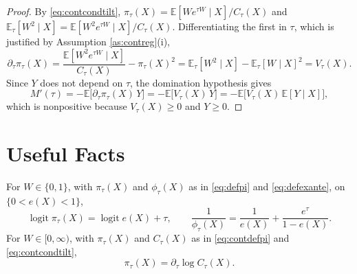 \documentclass[11pt]{article}
\theoremstyle{definition}
\theoremstyle{plain}
\newcommand{\E}{\mathbb{E}}
\newcommand{\1}{\mathbf{1}}
\begin{document}
\begin{proof}
By \eqref{eq:contcondtilt}, $\pi_\tau(X)=\E[We^{\tau W}\mid X]/C_\tau(X)$ and $\E_\tau[W^2\mid X]=\E[W^2e^{\tau W}\mid X]/C_\tau(X)$.  Differentiating the first in $\tau$, which is justified by Assumption \ref{as:contreg}(i),
\[
\partial_\tau\pi_\tau(X)
=\frac{\E[W^2e^{\tau W}\mid X]}{C_\tau(X)}-\pi_\tau(X)^2
=\E_\tau[W^2\mid X]-\E_\tau[W\mid X]^2
=V_\tau(X).
\]
Since $Y$ does not depend on $\tau$, the domination hypothesis gives
\[
M'(\tau)=-\E\bigl[\partial_\tau\pi_\tau(X)\,Y\bigr]=-\E\bigl[V_\tau(X)\,Y\bigr]
=-\E\bigl[V_\tau(X)\,\E[Y\mid X]\bigr],
\]
which is nonpositive because $V_\tau(X)\ge 0$ and $Y\ge 0$.
\end{proof}

\section{Useful Facts}

For $W\in\{0,1\}$, with $\pi_\tau(X)$ and $\phi_\tau(X)$ as in \eqref{eq:defpi} and \eqref{eq:defexante}, on $\{0<e(X)<1\}$,
\begin{equation}
\operatorname{logit}\pi_\tau(X)=\operatorname{logit}e(X)+\tau,
\qquad
\frac{1}{\phi_\tau(X)}=\frac{1}{e(X)}+\frac{e^{\tau}}{1-e(X)}.
\label{eq:logitform}
\end{equation}
For $W\in[0,\infty)$, with $\pi_\tau(X)$ and $C_\tau(X)$ as in \eqref{eq:contdefpi} and \eqref{eq:contcondtilt},
\[
\pi_\tau(X)=\partial_\tau\log C_\tau(X).
\]
\end{document}
